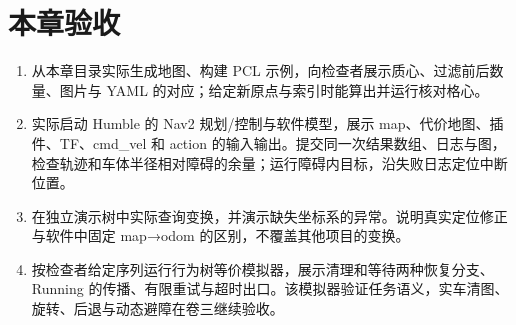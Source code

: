 \section{本章验收}
\begin{enumerate}
\item 从本章目录实际生成地图、构建 PCL 示例，向检查者展示质心、过滤前后数量、图片与 YAML 的对应；给定新原点与索引时能算出并运行核对格心。
\item 实际启动 Humble 的 Nav2 规划/控制与软件模型，展示 map、代价地图、插件、TF、cmd\_vel 和 action 的输入输出。提交同一次结果数组、日志与图，检查轨迹和车体半径相对障碍的余量；运行障碍内目标，沿失败日志定位中断位置。
\item 在独立演示树中实际查询变换，并演示缺失坐标系的异常。说明真实定位修正与软件中固定 map→odom 的区别，不覆盖其他项目的变换。
\item 按检查者给定序列运行行为树等价模拟器，展示清理和等待两种恢复分支、Running 的传播、有限重试与超时出口。该模拟器验证任务语义，实车清图、旋转、后退与动态避障在卷三继续验收。
\end{enumerate}
